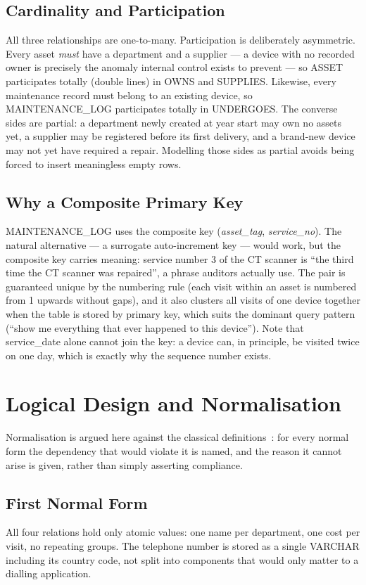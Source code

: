 \documentclass[conference]{IEEEtran}
\begin{document}
\subsection{Cardinality and Participation}
All three relationships are one-to-many. Participation is deliberately
asymmetric. Every asset \emph{must} have a department and a supplier --- a
device with no recorded owner is precisely the anomaly internal control
exists to prevent --- so ASSET participates totally (double lines) in OWNS
and SUPPLIES. Likewise, every maintenance record must belong to an existing
device, so MAINTENANCE\_LOG participates totally in UNDERGOES. The converse
sides are partial: a department newly created at year start may own no
assets yet, a supplier may be registered before its first delivery, and a
brand-new device may not yet have required a repair. Modelling those sides
as partial avoids being forced to insert meaningless empty rows.

\subsection{Why a Composite Primary Key}
MAINTENANCE\_LOG uses the composite key (\textit{asset\_tag},
\textit{service\_no}). The natural alternative --- a surrogate
auto-increment key --- would work, but the composite key carries meaning:
service number 3 of the CT scanner is ``the third time the CT scanner was
repaired'', a phrase auditors actually use. The pair is guaranteed unique by
the numbering rule (each visit within an asset is numbered from 1 upwards
without gaps), and it also clusters all visits of one device together when
the table is stored by primary key, which suits the dominant query pattern
(``show me everything that ever happened to this device''). Note that
service\_date alone cannot join the key: a device can, in principle, be
visited twice on one day, which is exactly why the sequence number exists.

\section{Logical Design and Normalisation}\label{sec:normalisation}
Normalisation is argued here against the classical definitions~\cite{connolly,elmasri}:
for every normal form the dependency that would violate it is named, and the
reason it cannot arise is given, rather than simply asserting compliance.
\subsection{First Normal Form}
All four relations hold only atomic values: one name per department, one
cost per visit, no repeating groups. The telephone number is stored as a
single VARCHAR including its country code, not split into components that
would only matter to a dialling application.
\end{document}

